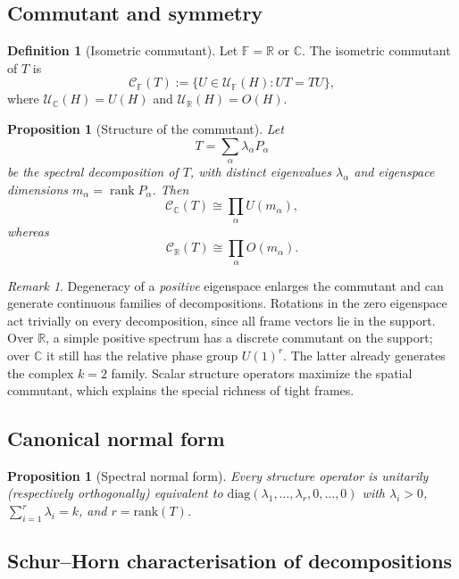 \documentclass[
  twocolumn,
  aps,
  pra,
  floatfix,
  amsmath,amssymb,
  longbibliography
]{revtex4-2}
\newtheorem{proposition}[theorem]{Proposition}
\theoremstyle{definition}
\newtheorem{definition}[theorem]{Definition}
\theoremstyle{remark}
\newtheorem{remark}[theorem]{Remark}
\begin{document}
\subsection{Commutant and symmetry}

\begin{definition}[Isometric commutant]\label{def:commutant}
Let \(\mathbb F=\mathbb R\) or \(\mathbb C\). The isometric commutant of \(T\) is
\[
\mathcal C_{\mathbb F}(T)
:=
\{U\in \mathcal U_{\mathbb F}(H):UT=TU\},
\]
where \(\mathcal U_{\mathbb C}(H)=U(H)\) and
\(\mathcal U_{\mathbb R}(H)=O(H)\).
\end{definition}

\begin{proposition}[Structure of the commutant]\label{prop:commutant}
Let
\[
T=\sum_\alpha \lambda_\alpha P_\alpha
\]
be the spectral decomposition of \(T\), with distinct eigenvalues
\(\lambda_\alpha\) and eigenspace dimensions \(m_\alpha=\operatorname{rank}P_\alpha\).
Then
\[
\mathcal C_{\mathbb C}(T)\cong \prod_\alpha U(m_\alpha),
\]
whereas
\[
\mathcal C_{\mathbb R}(T)\cong \prod_\alpha O(m_\alpha).
\]
\end{proposition}

\begin{remark}
Degeneracy of a \emph{positive} eigenspace enlarges the commutant and can
generate continuous families of decompositions.  Rotations in the zero
eigenspace act trivially on every decomposition, since all frame vectors
lie in the support.  Over $\mathbb R$, a simple positive spectrum has a
discrete commutant on the support; over $\mathbb C$ it still has the
relative phase group $U(1)^r$.  The latter already generates the complex
$k=2$ family.  Scalar structure operators maximize the spatial
commutant, which explains the special richness of tight frames.
\end{remark}

\subsection{Canonical normal form}

\begin{proposition}[Spectral normal form]\label{prop:normalform}
Every structure operator is unitarily (respectively orthogonally) equivalent to
$\mathrm{diag}(\lambda_1,\ldots,\lambda_r,0,\ldots,0)$ with
$\lambda_i>0$, $\sum_{i=1}^r\lambda_i=k$, and
$r=\mathrm{rank}(T)$.
\end{proposition}

\subsection{Schur--Horn characterisation of decompositions}
\end{document}
